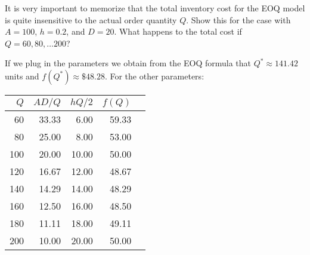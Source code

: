 \begin{comment}
\begin{exercise} \nvf{This idea is actually wrong. What if inventory is $Q^3$. We have to remove this.}
All the figures suggest that the optimal order quantity is such an order quantity where the ordering and inventory costs per unit time are the same. Is it always the case?


\begin{solution}
Yes. A formal proof can also be provided, but the intuition behind it is more important and it is rather simple. Because average procurement cost per unit time is constant, the cost trade-off lies in ordering and inventory costs per unit time. It is easy to see that the average ordering cost is decreasing in $Q$ and the average holding cost is increasing in $Q$ (see formulas and figures). Therefore, it is always better to choose a $Q$ such that these cost are balanced.
\end{solution}
\end{exercise}
\end{comment}

\begin{exercise}
  It is very important to memorize that the total inventory cost for
  the EOQ model is quite insensitive to the actual order quantity
  $Q$. Show this for the case with $A=100$, $h=0.2$, and $D=20$. What
  happens to the total cost if $Q=60, 80, \ldots 200$?
  \begin{solution}
If we plug in the parameters we obtain from the EOQ formula that $Q^{*} \approx 141.42$ units and $f(Q^{*}) \approx \mathdollar 48.28$. For the other parameters:
\begin{center}
\footnotesize
\begin{tabular}{rrrrr}
\toprule
$Q$     & $AD/Q$  &  $hQ/2$  & $f(Q)$ \\
\midrule
    60    & 33.33 &  6.00  & 59.33 \\
    80    & 25.00 &  8.00  & 53.00 \\
    100   & 20.00 &  10.00 & 50.00 \\
    120   & 16.67 &  12.00 & 48.67 \\
    140   & 14.29 &  14.00 & 48.29 \\
    160   & 12.50 &  16.00 & 48.50 \\
    180   & 11.11 &  18.00 & 49.11 \\
    200   & 10.00 &  20.00 & 50.00 \\
\bottomrule
\end{tabular}
\end{center}
  \end{solution}
\end{exercise}


